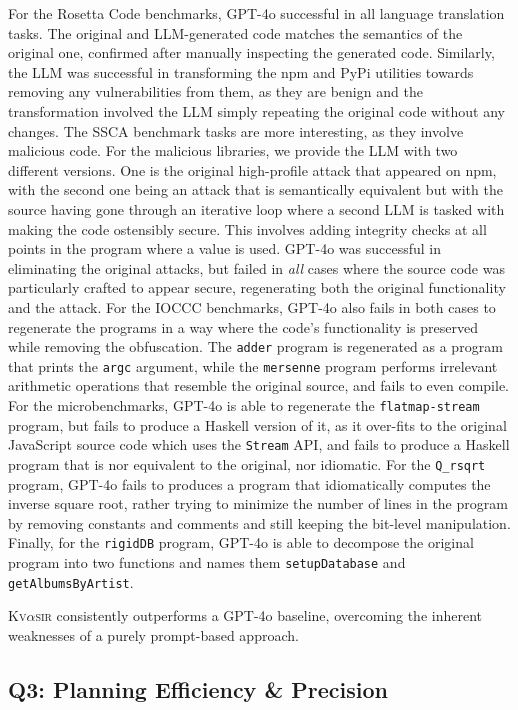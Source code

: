 \documentclass[nonacm,sigplan,review]{acmart}
\def\gptmodel{{GPT-4o}\xspace}
\newcommand{\sys}{{\scshape Kv{$\alpha$}sir}\xspace}
\newcommand{\ttt}[1]{\texttt{#1}\xspace}
\begin{document}
For the Rosetta Code benchmarks, \gptmodel 
successful in all language translation tasks.
The original and LLM-generated code matches the semantics
of the original one, confirmed after manually inspecting the generated code.
Similarly, the LLM was successful in transforming the npm and PyPi utilities towards
removing any vulnerabilities from them, as they are benign and the transformation
involved the LLM simply repeating the original code without any changes.
The SSCA benchmark tasks are more interesting, as they involve 
malicious code. For the malicious libraries, we provide the LLM 
with two different versions. One is the original high-profile attack that appeared on npm,
with the second one being an attack that is semantically equivalent but with the source 
having gone through an iterative loop where a second LLM is tasked with making the code ostensibly 
secure. This involves adding integrity checks at all points in the program where a value is used.
\gptmodel was successful in eliminating the original attacks, but failed in \emph{all} 
cases where the source code was particularly crafted to appear secure, regenerating both 
the original functionality and the attack.
For the IOCCC benchmarks, \gptmodel also fails 
in both cases to regenerate the programs in a way where the code's 
functionality is preserved while removing the obfuscation.
The \ttt{adder} program is regenerated as a program that prints the \ttt{argc} argument, 
while the \ttt{mersenne} program performs irrelevant arithmetic operations that 
resemble the original source, and fails to even compile.
For the microbenchmarks, \gptmodel is able to regenerate the \ttt{flatmap-stream} program, but fails to produce a Haskell version of it,
as it over-fits to the original JavaScript source code which uses the \ttt{Stream} API,
and fails to produce a Haskell program that is nor equivalent to the original, nor idiomatic.
For the \ttt{Q\_rsqrt} program, \gptmodel fails to produces a program that idiomatically 
computes the inverse square root, rather trying to minimize the number of lines in the program
by removing constants and comments and still keeping the bit-level manipulation.
Finally, for the \ttt{rigidDB} program, \gptmodel is able to decompose the original program into two functions
and names them \ttt{setupDatabase} and \ttt{getAlbumsByArtist}.

\sys consistently outperforms a \gptmodel baseline,
overcoming the inherent weaknesses of a purely prompt-based approach.

\subsection{Q3: Planning Efficiency \& Precision}
\end{document}
